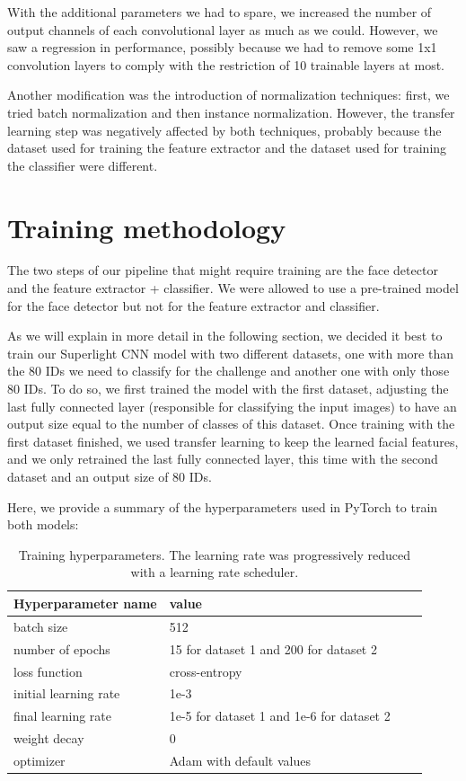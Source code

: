 \documentclass[11pt, a4paper]{article}
\numberwithin{equation}{subsection}
\begin{document}
With the additional parameters we had to spare, we increased the number of output channels of each convolutional layer as much as we could. However, we saw a regression in performance, possibly because we had to remove some 1x1 convolution layers to comply with the restriction of 10  trainable layers at most.

Another modification was the introduction of normalization techniques: first, we tried batch normalization and then instance normalization. However, the transfer learning step was negatively affected by both techniques, probably because the dataset used for training the feature extractor and the dataset used for training the classifier were different.

\section{Training methodology}

The two steps of our pipeline that might require training are the face detector and the feature extractor + classifier. We were allowed to use a pre-trained model for the face detector but not for the feature extractor and classifier.

As we will explain in more detail in the following section, we decided it best to train our Superlight CNN model with two different datasets, one with more than the 80 IDs we need to classify for the challenge and another one with only those 80 IDs. To do so, we first trained the model with the first dataset, adjusting the last fully connected layer (responsible for classifying the input images) to have an output size equal to the number of classes of this dataset. Once training with the first dataset finished, we used transfer learning to keep the learned facial features, and we only retrained the last fully connected layer, this time with the second dataset and an output size of 80 IDs.

Here, we provide a summary of the hyperparameters used in PyTorch to train both models:

\begin{table}[htbp]
    \centering
    \label{tab:training_hyperparams}
    \caption{Training hyperparameters. The learning rate was progressively reduced with a learning rate scheduler.}
    \begin{tabular}{|l|l|l|l|}
    \hline
    \textbf{Hyperparameter name} & \textbf{value} \\ \hline
    batch size & 512 \\
    number of epochs & 15 for dataset 1 and 200 for dataset 2 \\
    loss function & cross-entropy \\
    initial learning rate & 1e-3 \\
    final learning rate & 1e-5 for dataset 1 and 1e-6 for dataset 2 \\
    weight decay & 0 \\
    optimizer & Adam with default values \\
    \hline
    \end{tabular}
\end{table}
\end{document}
